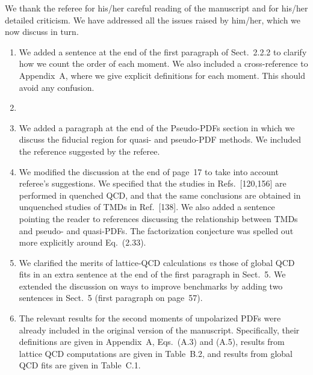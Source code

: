\documentclass[11pt]{article}
\begin{document}

We thank the referee for his/her careful reading of the manuscript and for 
his/her detailed criticism. We have addressed all the issues raised by 
him/her, which we now discuss in turn.

\begin{enumerate}

\item We added a sentence at the end of the first paragraph of Sect.~2.2.2
to clarify how we count the order of each moment. We also included a 
cross-reference to Appendix~A, where we give explicit definitions for each
moment. This should avoid any confusion.

\item 

\item We added a paragraph at the end of the Pseudo-PDFs section in which
we discuss the fiducial region for quasi- and pseudo-PDF methods.
We included the reference suggested by the referee. 

\item We modified the discussion at the end of page~17 to take into 
account referee's suggestions. We specified that
the studies in Refs.~[120,156] are performed in quenched QCD, and that the
same conclusions are obtained in unquenched studies of TMDs in Ref.~[138].
We also added a sentence pointing the reader to references discussing the
relationship between TMDs and pseudo- and quasi-PDFs.
The factorization conjecture was spelled out more explicitly around Eq.~(2.33).

\item We clarified the merits of lattice-QCD calculations {\it vs} those
of global QCD fits in an extra sentence at the end of the first paragraph
in Sect.~5. We extended the discussion on ways to improve benchmarks 
by adding two sentences in Sect.~5 (first paragraph on page~57).

\item The relevant results for the second moments of unpolarized PDFs
were already included in the original version of the manuscript. 
Specifically, their definitions are given in Appendix~A, Eqs.~(A.3) and (A.5),
results from lattice QCD computations are given in Table~B.2, and results from
global QCD fits are given in Table~C.1.


\end{enumerate}
\end{document}
